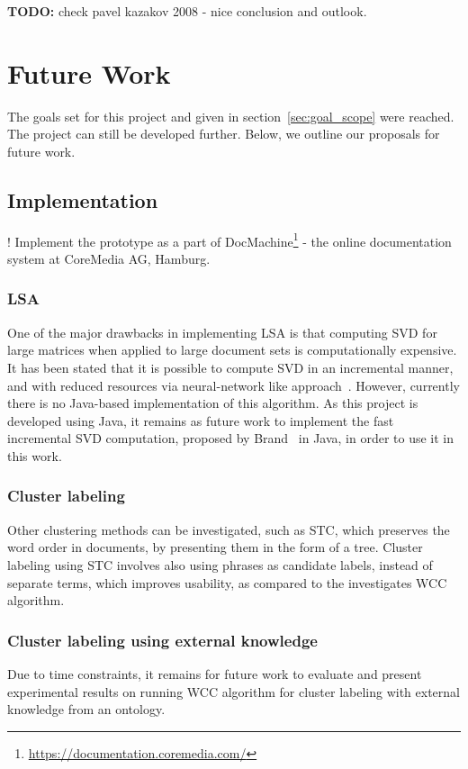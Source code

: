 \textbf{TODO:} check pavel kazakov 2008 - nice conclusion and outlook. \\

\section{Future Work}
The goals set for this project and given in section~\ref{sec:goal_scope} were reached. The project can still be developed further. Below, we outline our proposals for future work. \\

\subsection{Implementation}

! Implement the prototype as a part of DocMachine\footnote{\url{https://documentation.coremedia.com/}} - the online documentation system at CoreMedia AG, Hamburg.

\subsubsection{LSA}
One of the major drawbacks in implementing \gls{LSA} is that computing \gls{SVD} for large matrices when applied to large document sets is computationally expensive. It has been stated that it is possible to compute \gls{SVD} in an incremental manner, and with reduced resources via neural-network like approach~\cite{brand06}. However, currently there is no Java-based implementation of this algorithm. As this project is developed using Java, it remains as future work to implement the fast incremental \gls{SVD} computation, proposed by Brand~\cite{brand06} in Java, in order to use it in this work. \\

\subsubsection{Cluster labeling}
Other clustering methods can be investigated, such as \gls{STC}, which preserves the word order in documents, by presenting them in the form of a tree. Cluster labeling using \gls{STC} involves also using phrases as candidate labels, instead of separate terms, which improves usability, as compared 
to the investigates \gls{WCC} algorithm. \\

\subsubsection{Cluster labeling using external knowledge}
Due to time constraints, it remains for future work to evaluate and present experimental results on running \gls{WCC} algorithm for cluster labeling with external knowledge from an ontology. \\

